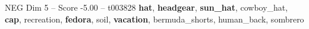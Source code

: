 \begin{textsample}{NEG Dim 5 – Score -5.00 – t003828}  \label{ex:f5_neg_034}
\textbf{hat}, \textbf{headgear}, \textbf{sun\_hat}, cowboy\_hat, \textbf{cap}, recreation, \textbf{fedora}, soil, \textbf{vacation}, bermuda\_shorts, human\_back, sombrero

\end{textsample}
